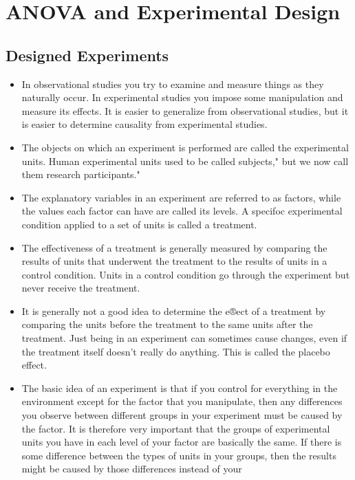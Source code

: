 




\chapter{ANOVA and Experimental Design }

\section{Designed Experiments}
\begin{itemize}
	\item In observational studies you try to examine and measure things as they naturally occur. In experimental studies you impose some manipulation and measure its effects. It is easier to generalize from
	observational studies, but it is easier to determine causality from experimental studies.
	\item The objects on which an experiment is performed are called the experimental units. Human experimental units used to be called subjects," but we now call them research participants."
	\item The explanatory variables in an experiment are referred to as factors, while the values each factor
	can have are called its levels. A specifoc experimental condition applied to a set of units is called a
	treatment.
	\item The effectiveness of a treatment is generally measured by comparing the results of units that underwent
	the treatment to the results of units in a control condition. Units in a control condition go through the
	experiment but never receive the treatment.
	\item It is generally not a good idea to determine the e®ect of a treatment by comparing the units before
	the treatment to the same units after the treatment. Just being in an experiment can sometimes cause
	changes, even if the treatment itself doesn't really do anything. This is called the placebo effect.
	\item The basic idea of an experiment is that if you control for everything in the environment except for
	the factor that you manipulate, then any differences you observe between different groups in your
	experiment must be caused by the factor. It is therefore very important that the groups of experimental
	units you have in each level of your factor are basically the same. If there is some difference between
	the types of units in your groups, then the results might be caused by those differences instead of your

\end{itemize}
